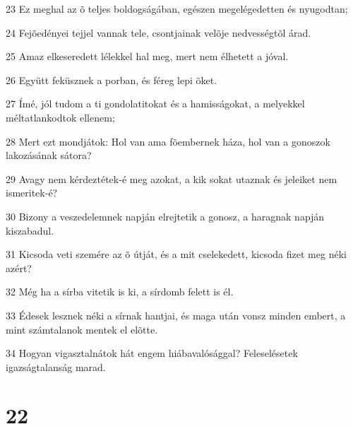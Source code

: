 \par 23 Ez meghal az õ teljes boldogságában, egészen megelégedetten és nyugodtan;
\par 24 Fejõedényei tejjel vannak tele, csontjainak velõje nedvességtõl árad.
\par 25 Amaz elkeseredett lélekkel hal meg, mert nem élhetett a jóval.
\par 26 Együtt feküsznek a porban, és féreg lepi õket.
\par 27 Ímé, jól tudom a ti gondolatitokat és a hamisságokat, a melyekkel méltatlankodtok ellenem;
\par 28 Mert ezt mondjátok: Hol van ama fõembernek háza, hol van a gonoszok lakozásának sátora?
\par 29 Avagy nem kérdeztétek-é meg azokat, a kik sokat utaznak és jeleiket nem ismeritek-é?
\par 30 Bizony a veszedelemnek napján elrejtetik a gonosz, a haragnak napján kiszabadul.
\par 31 Kicsoda veti szemére az õ útját, és a mit cselekedett, kicsoda fizet meg néki azért?
\par 32 Még ha a sírba vitetik is ki, a sírdomb felett is él.
\par 33 Édesek lesznek néki a sírnak hantjai, és maga után vonsz minden embert, a mint számtalanok mentek el elõtte.
\par 34 Hogyan vigasztalnátok hát engem hiábavalósággal? Feleselésetek igazságtalanság marad.

\chapter{22}


